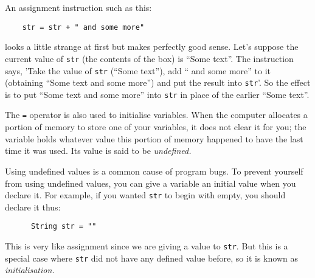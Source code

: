 %

An assignment instruction such as this:

\begin{Verbatim}
    str = str + " and some more"
\end{Verbatim}

looks a little strange at first but makes perfectly good sense.
Let's suppose the current value of \verb!str! (the contents of the
box) is ``Some text''.
The instruction says, 'Take the value of \verb!str!
(``Some text''), add `` and some more''  to it (obtaining ``Some text and some
more'') 
and put the result into \verb!str!'.
So the effect is to put ``Some text and some more'' into \verb!str! in
place of the earlier ``Some text''.

The \verb!=! operator is also used to initialise variables.  When the computer
allocates a portion of memory to store one of your variables, it does not
clear it for you; the variable holds whatever value this portion of memory
happened to have the last time it was used.  Its value is said to be
\emph{undefined.}

Using undefined values is a common cause of program
bugs.  
%
To prevent yourself from using undefined values, you can give a variable
an initial value when you declare it.  For example, if you wanted \verb!str! to begin
with empty, you should declare it thus:

\begin{Verbatim}
      String str = ""
\end{Verbatim}

This is very like assignment since we are giving a value to \verb!str!. But
this is a special case where \verb!str! did not have any defined value before,
so it is known as \emph{initialisation.}

